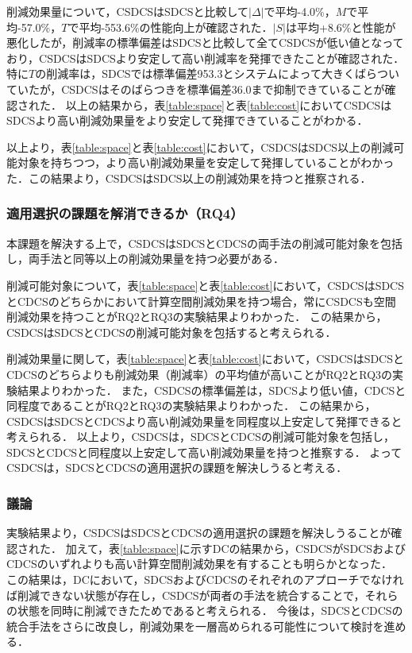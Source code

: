 削減効果量について，CSDCSはSDCSと比較して$|\Delta|$で平均-4.0\%，$M$で平均-57.0\%，$T$で平均-553.6\%の性能向上が確認された．$|S|$は平均+8.6\%と性能が悪化したが，削減率の標準偏差はSDCSと比較して全てCSDCSが低い値となっており，CSDCSはSDCSより安定して高い削減率を発揮できたことが確認された．特に$T$の削減率は，SDCSでは標準偏差953.3とシステムによって大きくばらついていたが，CSDCSはそのばらつきを標準偏差36.0まで抑制できていることが確認された．
以上の結果から，表\ref{table:space}と表\ref{table:cost}においてCSDCSはSDCSより高い削減効果量をより安定して発揮できていることがわかる．

以上より，表\ref{table:space}と表\ref{table:cost}において，CSDCSはSDCS以上の削減可能対象を持ちつつ，より高い削減効果量を安定して発揮していることがわかった．この結果より，CSDCSはSDCS以上の削減効果を持つと推察される．

\subsubsection{適用選択の課題を解消できるか（RQ4）}
本課題を解決する上で，CSDCSはSDCSとCDCSの両手法の削減可能対象を包括し，両手法と同等以上の削減効果量を持つ必要がある．

削減可能対象について，表\ref{table:space}と表\ref{table:cost}において，CSDCSはSDCSとCDCSのどちらかにおいて計算空間削減効果を持つ場合，常にCSDCSも空間削減効果を持つことがRQ2とRQ3の実験結果よりわかった．
この結果から，CSDCSはSDCSとCDCSの削減可能対象を包括すると考えられる．

削減効果量に関して，表\ref{table:space}と表\ref{table:cost}において，CSDCSはSDCSとCDCSのどちらよりも削減効果（削減率）の平均値が高いことがRQ2とRQ3の実験結果よりわかった．
また，CSDCSの標準偏差は，SDCSより低い値，CDCSと同程度であることがRQ2とRQ3の実験結果よりわかった．
この結果から，CSDCSはSDCSとCDCSより高い削減効果量を同程度以上安定して発揮できると考えられる．
以上より，CSDCSは，SDCSとCDCSの削減可能対象を包括し，SDCSとCDCSと同程度以上安定して高い削減効果量を持つと推察する．
よってCSDCSは，SDCSとCDCSの適用選択の課題を解決しうると考える．


\subsubsection{議論}
実験結果より，CSDCSはSDCSとCDCSの適用選択の課題を解決しうることが確認された．
加えて，表\ref{table:space}に示すDCの結果から，CSDCSがSDCSおよびCDCSのいずれよりも高い計算空間削減効果を有することも明らかとなった．
この結果は，DCにおいて，SDCSおよびCDCSのそれぞれのアプローチでなければ削減できない状態が存在し，CSDCSが両者の手法を統合することで，それらの状態を同時に削減できたためであると考えられる．
今後は，SDCSとCDCSの統合手法をさらに改良し，削減効果を一層高められる可能性について検討を進める．

